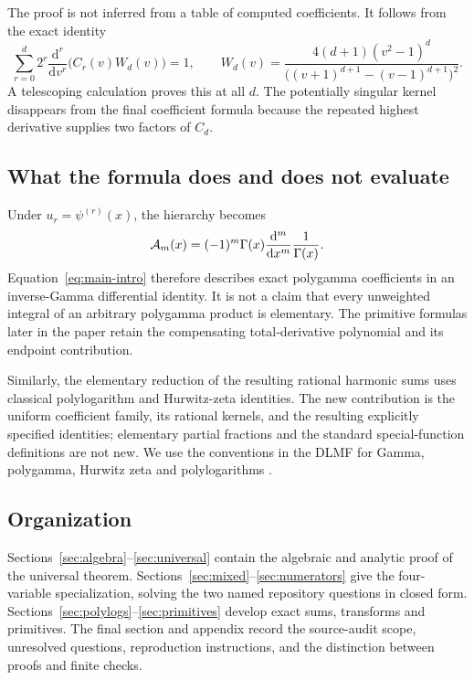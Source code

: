 The proof is not inferred from a table of computed coefficients. It follows from the exact identity
\begin{equation}\label{eq:adjoint-intro}
 \sum_{r=0}^d2^r\frac{\mathrm d^r}{\mathrm dv^r}
       \bigl(C_r(v)W_d(v)\bigr)=1,
 \qquad
 W_d(v)=\frac{4(d+1)(v^2-1)^d}
 {\bigl((v+1)^{d+1}-(v-1)^{d+1}\bigr)^2}.
\end{equation}
A telescoping calculation proves this at all $d$. The potentially singular kernel disappears from the final coefficient formula because the repeated highest derivative supplies two factors of $C_d$.

\subsection{What the formula does and does not evaluate}

Under $u_r=\psi^{(r)}(x)$, the hierarchy becomes
\[
 \mathcal A_m(x)=(-1)^m\Gamma(x)\frac{\mathrm d^m}{\mathrm dx^m}
                         \frac1{\Gamma(x)}.
\]
Equation~\eqref{eq:main-intro} therefore describes exact polygamma coefficients in an inverse-Gamma differential identity. It is not a claim that every unweighted integral of an arbitrary polygamma product is elementary. The primitive formulas later in the paper retain the compensating total-derivative polynomial and its endpoint contribution.

Similarly, the elementary reduction of the resulting rational harmonic sums uses classical polylogarithm and Hurwitz-zeta identities. The new contribution is the uniform coefficient family, its rational kernels, and the resulting explicitly specified identities; elementary partial fractions and the standard special-function definitions are not new. We use the conventions in the DLMF for Gamma, polygamma, Hurwitz zeta and polylogarithms \cite{DLMFGamma,DLMFHurwitz,DLMFPolylog}.

\subsection{Organization}

Sections~\ref{sec:algebra}--\ref{sec:universal} contain the algebraic and analytic proof of the universal theorem. Sections~\ref{sec:mixed}--\ref{sec:numerators} give the four-variable specialization, solving the two named repository questions in closed form. Sections~\ref{sec:polylogs}--\ref{sec:primitives} develop exact sums, transforms and primitives. The final section and appendix record the source-audit scope, unresolved questions, reproduction instructions, and the distinction between proofs and finite checks.
